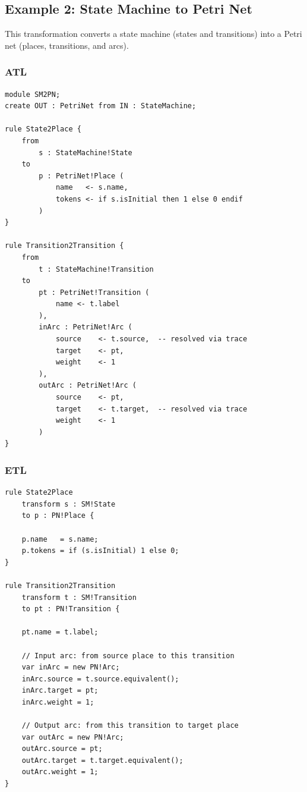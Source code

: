 \documentclass[11pt,a4paper]{article}
\begin{document}
\subsection{Example 2: State Machine to Petri Net}

This transformation converts a state machine (states and transitions) into a Petri net (places, transitions, and arcs).

\subsubsection{ATL}

\begin{lstlisting}[style=atl,caption={StateMachine2PetriNet in ATL}]
module SM2PN;
create OUT : PetriNet from IN : StateMachine;

rule State2Place {
    from
        s : StateMachine!State
    to
        p : PetriNet!Place (
            name   <- s.name,
            tokens <- if s.isInitial then 1 else 0 endif
        )
}

rule Transition2Transition {
    from
        t : StateMachine!Transition
    to
        pt : PetriNet!Transition (
            name <- t.label
        ),
        inArc : PetriNet!Arc (
            source    <- t.source,  -- resolved via trace
            target    <- pt,
            weight    <- 1
        ),
        outArc : PetriNet!Arc (
            source    <- pt,
            target    <- t.target,  -- resolved via trace
            weight    <- 1
        )
}
\end{lstlisting}

\subsubsection{ETL}

\begin{lstlisting}[style=etl,caption={StateMachine2PetriNet in ETL}]
rule State2Place
    transform s : SM!State
    to p : PN!Place {

    p.name   = s.name;
    p.tokens = if (s.isInitial) 1 else 0;
}

rule Transition2Transition
    transform t : SM!Transition
    to pt : PN!Transition {

    pt.name = t.label;

    // Input arc: from source place to this transition
    var inArc = new PN!Arc;
    inArc.source = t.source.equivalent();
    inArc.target = pt;
    inArc.weight = 1;

    // Output arc: from this transition to target place
    var outArc = new PN!Arc;
    outArc.source = pt;
    outArc.target = t.target.equivalent();
    outArc.weight = 1;
}
\end{lstlisting}
\end{document}
